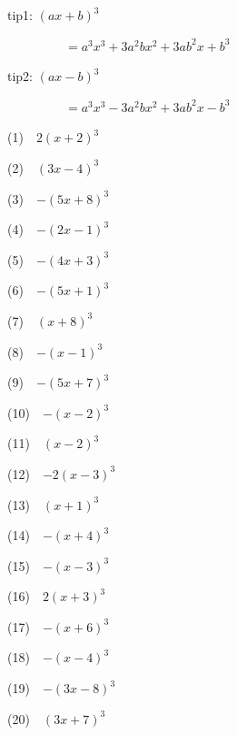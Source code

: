 \documentclass[a4j,twocolumn,10pt,fleqn]{jarticle}
\begin{document}
tip1: $\left(a x + b\right)^{3}$

~~~~~~~~~$=a^{3} x^{3} + 3 a^{2} b x^{2} + 3 a b^{2} x + b^{3}$


tip2: $\left(a x - b\right)^{3}$

~~~~~~~~~$=a^{3} x^{3} - 3 a^{2} b x^{2} + 3 a b^{2} x - b^{3}$


(1)~~$2\left(x + 2\right)^{3}$

(2)~~$\left(3 x - 4\right)^{3}$

(3)~~$-\left(5 x + 8\right)^{3}$

(4)~~$-\left(2 x - 1\right)^{3}$

(5)~~$-\left(4 x + 3\right)^{3}$

(6)~~$-\left(5 x + 1\right)^{3}$

(7)~~$\left(x + 8\right)^{3}$

(8)~~$-\left(x - 1\right)^{3}$

(9)~~$-\left(5 x + 7\right)^{3}$

(10)~~$-\left(x - 2\right)^{3}$

(11)~~$\left(x - 2\right)^{3}$

(12)~~$-2\left(x - 3\right)^{3}$

(13)~~$\left(x + 1\right)^{3}$

(14)~~$-\left(x + 4\right)^{3}$

(15)~~$-\left(x - 3\right)^{3}$

(16)~~$2\left(x + 3\right)^{3}$

(17)~~$-\left(x + 6\right)^{3}$

(18)~~$-\left(x - 4\right)^{3}$

(19)~~$-\left(3 x - 8\right)^{3}$

(20)~~$\left(3 x + 7\right)^{3}$
\end{document}
